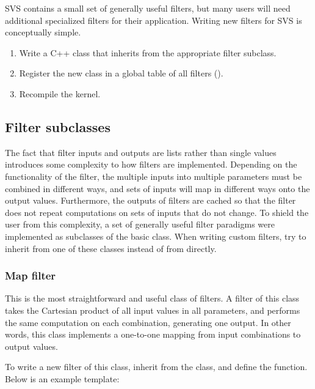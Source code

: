 SVS contains a small set of generally useful filters, but many users will need additional specialized filters for their application.
Writing new filters for SVS is conceptually simple.

\vspace{-12pt}
\begin{enumerate}
	\item Write a C++ class that inherits from the appropriate filter subclass.
	\vspace{-6pt}
	\item Register the new class in a global table of all filters ().
	\vspace{-6pt}
	\item Recompile the kernel.
	\vspace{-6pt}
\end{enumerate}


\subsection{Filter subclasses}

The fact that filter inputs and outputs are lists rather than single values introduces some complexity to how filters are implemented.
Depending on the functionality of the filter, the multiple inputs into multiple parameters must be combined in different ways, and sets of inputs will map in different ways onto the output values.
Furthermore, the outputs of filters are cached so that the filter does not repeat computations on sets of inputs that do not change.
To shield the user from this complexity, a set of generally useful filter paradigms were implemented as subclasses of the basic  class.
When writing custom filters, try to inherit from one of these classes instead of from  directly.


\subsubsection{Map filter}

This is the most straightforward and useful class of filters.
A filter of this class takes the Cartesian product of all input values in all parameters,
and performs the same computation on each combination, generating one output.
In other words, this class implements a one-to-one mapping from input combinations to output values.

To write a new filter of this class, inherit from the  class,
and define the  function. Below is an example template:

